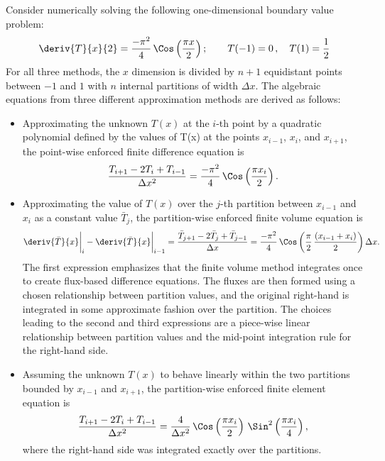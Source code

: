 Consider numerically solving the following one-dimensional boundary value problem:
\begin{equation}
    \deriv{T}{x}{2} = \frac{-\pi^2}{4}\,\Cos\left(\frac{\pi x}{2}\right);\quad\quad T(-1) = 0\,,\quad T(1) = \frac{1}{2}
    \label{Eqn:NM_Example_BVP}
\end{equation}
For all three methods, the $x$ dimension is divided by $n+1$ equidistant points between $-1$ and $1$ with $n$ internal partitions of width $\Delta{x}$.
The algebraic equations from three different approximation methods are derived as follows:
\begin{itemize}
	\item{
        Approximating the unknown $T(x)$ at the $i$-th point by a quadratic polynomial defined by the values of T(x) at the points $x_{i-1}$, $x_{i}$, and $x_{i+1}$, the point-wise enforced finite difference equation is
        \begin{equation}
            \frac{T_{i+1} - 2 T_i + T_{i-1}}{\Delta{x}^2} = \frac{-\pi^2}{4}\,\Cos\left(\frac{\pi x_i}{2}\right).
        \end{equation}
    }
    \item{
        Approximating the value of $T(x)$ over the $j$-th partition between $x_{i-1}$ and $x_{i}$ as a constant value $\bar{T}_{j}$, the partition-wise enforced finite volume equation is
        \begin{equation}
            \deriv{\bar{T}}{x}\bigg\rvert_{i} - \deriv{\bar{T}}{x}\bigg\rvert_{i-1} = 
            \frac{\bar{T}_{j+1} - 2 \bar{T}_j + \bar{T}_{j-1}}{\Delta{x}} = \frac{-\pi^2}{4}\,\Cos\left(\frac{\pi}{2}\,\frac{(x_{i-1}+x_i)}{2}\right) \Delta{x}.
        \end{equation}
        The first expression emphasizes that the finite volume method integrates once to create flux-based difference equations.
        The fluxes are then formed using a chosen relationship between partition values, and the original right-hand is integrated in some approximate fashion over the partition.  The choices leading to the second and third expressions are a piece-wise linear relationship between partition values and the mid-point integration rule for the right-hand side.
    }
    \item{
        Assuming the unknown $T(x)$ to behave linearly within the two partitions bounded by $x_{i-1}$ and $x_{i+1}$, the partition-wise enforced finite element equation is
        \begin{equation}
            \frac{T_{i+1} - 2 T_i + T_{i-1}}{\Delta{x}^2} = \frac{4}{\Delta{x}^2}\,\Cos\left(\frac{\pi x_i}{2}\right)\,\Sin^2\left(\frac{\pi x_i}{4}\right),
        \end{equation}
        where the right-hand side was integrated exactly over the partitions.
    }
\end{itemize}

